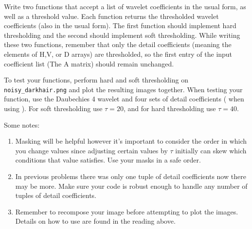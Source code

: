 
\begin{problem}
Write two functions that accept a list of wavelet coefficients in the usual form, as well as a threshold value. Each function returns the thresholded wavelet coefficients (also in the usual form). The first function should implement hard thresholding and the second should implement soft thresholding.
While writing these two functions, remember that only the detail coefficients (meaning the elements of H,V, or D arrays) are thresholded, so the first entry of the input coefficient list (The A matrix) should remain unchanged.

To test your functions, perform hard and soft thresholding on \texttt{noisy\_darkhair.png} and plot the resulting images together.
When testing your function, use the Daubechies 4 wavelet and four sets of detail coefficients ( when using ).
For soft thresholding use $\tau=20$, and for hard thresholding use $\tau=40$.

\noindent Some notes:
\begin{enumerate}
\item Masking will be helpful however it's important to consider the order in which you change values since adjusting certain values by $\tau$ initially can skew which conditions that value satisfies. Use your masks in a safe order.
\item In previous problems there was only one tuple of detail coefficients now there may be more. Make sure your code is robust enough to handle any number of tuples of detail coefficients.
\item Remember to recompose your image before attempting to plot the images.
Details on how to use  are found in the reading above.
\end{enumerate}

\end{problem}

\begin{comment}
\begin{problem}
Create a noisy version of the Lena image by adding Gaussian
white noise of mean 0 and standard deviation $\sigma = 20$ (i.e. \li{scale=20}).
Compute four levels of the wavelet coefficients using the Daubechies 4 Wavelet,
and input these into your
thresholding functions (with $\tau = 3\sigma$ for the hard threshold,
and $\tau = 3\sigma/2$ for the soft threshold). Reconstruct the
two denoised images, and then plot these together alongside the
noisy image. Your output should match Figure \ref{fig:denoise}.

What do you notice? How does lowering or raising the
threshold affect the reconstructed images? What happens if you use
a different Wavelet?
\end{problem}
\end{comment}


